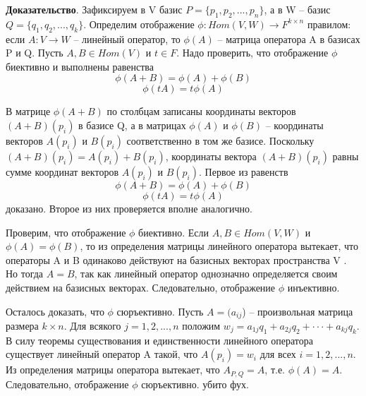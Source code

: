 \documentclass[a4paper]{article}
\begin{document}
    \begin{hproof}
        \textbf{Доказательство}. Зафиксируем в V базис $P = \{ p_1, p_2, . . . , p_n \}$, а в W –
        базис $Q = \{ q_1, q_2, . . . , q_k \}$. Определим отображение
        $\phi: Hom(V, W) \rightarrow F^{k \times n}$
        правилом: если $A: V \rightarrow W$ – линейный оператор,
        то $\phi(A)$ – матрица оператора A в базисах P и Q. Пусть $A, B \in Hom(V)$ и
        $t \in F$. Надо проверить, что отображение $\phi$ биективно и выполнены равенства \begin{equation}
                                                                                              \phi (A+B) = \phi(A) + \phi(B)
        \end{equation}
        \begin{equation}
            \phi(tA) = t \phi(A)
        \end{equation}

        В матрице $\phi(A+B)$ по столбцам записаны координаты векторов
        $(A + B)(p_i)$ в базисе Q, а в матрицах $\phi(A)$ и $\phi(B)$ – координаты векторов
        $A(p_i)$ и $B(p_i)$ соответственно в том же базисе. Поскольку
        $(A + B)(p_i) = A(p_i) + B(p_i)$, координаты вектора $(A + B)(p_i)$ равны
        сумме координат векторов $A(p_i)$ и $B(p_i)$. Первое из равенств \begin{equation}
                                                                             \phi (A+B) = \phi(A) + \phi(B)
        \end{equation}
        \begin{equation}
            \phi(tA) = t \phi(A)
        \end{equation}
        доказано. Второе из них проверяется вполне аналогично.

        Проверим, что отображение $\phi$ биективно. Если $A, B \in Hom(V, W)$ и
        $\phi(A) = \phi(B)$, то из определения матрицы линейного оператора вытекает,
        что операторы A и B одинаково действуют на базисных векторах
        пространства V . Но тогда $A = B$, так как линейный оператор однозначно
        определяется своим действием на базисных векторах. Следовательно,
        отображение $\phi$ инъективно.

        Осталось доказать, что $\phi$ сюръективно. Пусть $A = (a_{ij}$) – произвольная
        матрица размера $k \times n$. Для всякого $j = 1, 2, . . . , n$ положим
        $w_j = a_{1j}q_1 + a_{2j}q_2 + · · · + a_{kj}q_k$. В силу теоремы существования и
        единственности линейного оператора существует линейный оператор A
        такой, что $A(p_i) = w_i$ для всех $i = 1, 2, . . . , n$. Из определения матрицы
        оператора вытекает, что $A_{P,Q} = A$, т.е. $\phi(A) = A$. Следовательно, отображение $\phi$ сюръективно. убито фух.
    \end{hproof}
\end{document}
